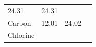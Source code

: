 \begin{enumerate}[noitemsep, label=\textbf{\arabic*}. ]
{{\begin{center}
\begin{xtabular}[t]{|l|l|l|l|}
    
        24.31 &
    
    
        24.31 &
    
    
     \tabularnewline{}
    
    
        Carbon &
    
    
        12.01 &
    
    
        24.02 &
    
    
     \tabularnewline{}
    
    
        Chlorine &
    

\end{xtabular}
\end{center}}}
\end{enumerate}
